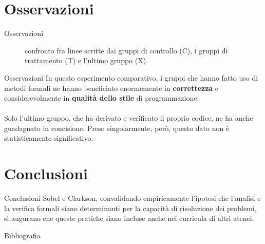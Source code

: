 \documentclass{beamer}
\begin{document}
\section{Osservazioni}

\begin{frame}{Osservazioni}
	\begin{figure}
		\caption{confronto fra linee scritte dai gruppi di controllo (C), i gruppi
			di trattamento (T) e l'ultimo gruppo (X).}
	\end{figure}
\end{frame}

\begin{frame}{Osservazioni}
	In questo esperimento comparativo, i gruppi che hanno fatto uso di metodi
	formali ne hanno beneficiato enormemente in \textbf{correttezza} e
	considerevolmente in \textbf{qualità dello stile} di programmazione.
	\\~\\
	Solo l'ultimo gruppo, che ha derivato e verificato il proprio codice, ne ha
	anche guadagnato in concisione. Preso singolarmente, però, questo dato non è
	statisticamente significativo.
\end{frame}

\section{Conclusioni}
\begin{frame}{Conclusioni}
	Sobel e Clarkson, convalidando empiricamente l'ipotesi che l'analisi e la
	verifica formali siano determinanti per la capacità di risoluzione dei
	problemi, si augurano che queste pratiche siano incluse anche nei curricula di
	altri atenei.
\end{frame}

\begin{frame}{Bibliografia}
	\printbibliography
\end{frame}
\end{document}
